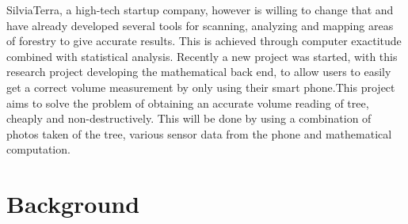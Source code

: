 SilviaTerra, a high-tech startup company, however is willing to change that and have already developed several tools for scanning, analyzing and mapping areas of forestry to give accurate results. This is achieved through computer exactitude combined with statistical analysis. Recently a new project was started, with this research project developing the mathematical back end, to allow users to easily get a correct volume measurement by only using their smart phone.This project aims to solve the problem of obtaining an accurate volume reading of tree, cheaply and non-destructively. This will be done by using a combination of photos taken of the tree, various sensor data from the phone and mathematical computation.

\section{Background}

